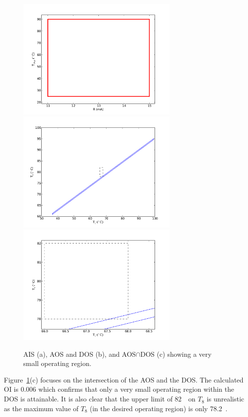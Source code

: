 \documentclass[final,authoryear,5pt,times,twocolumn]{elsarticle}
\begin{document}
\begin{figure}[htbp]
  \centering
    \includegraphics[width=8cm]{columnais.pdf}
    \includegraphics[width=8cm]{columnaos.pdf}
    \includegraphics[width=8cm]{columnaosfocus.pdf}
  \caption{AIS (a), AOS and DOS (b), and AOS$\cap$DOS (c) showing a very small operating region.}
  \label{fig:columnaisaos}
\end{figure}

Figure~\ref{fig:columnaisaos}(c) focuses on the intersection of the AOS and the DOS.
The calculated OI is 0.006 which confirms that only a very small operating region within the DOS is attainable.
It is also clear that the upper limit of 82~\textcelsius\ on $T_8$ is unrealistic as the maximum value of $T_8$ (in the desired operating region) is only 78.2~\textcelsius.
\end{document}
